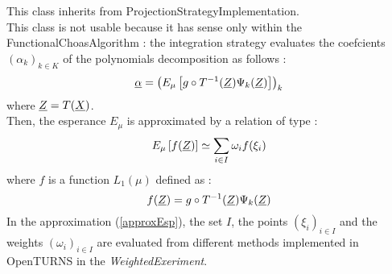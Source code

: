 This class inherits from ProjectionStrategyImplementation.\\

This class is not usable because it has sense only within the FunctionalChoasAlgorithm : the integration strategy evaluates the coefcients $(\alpha_k)_{k \in K}$ of the polynomials decomposition as follows : 
\begin{equation}\label{defEsp}
{\underline{\alpha}} = \left( E_{\mu} \left[ g \circ T^{-1}({\underline{Z}}) \Psi_k ({\underline{Z}}) \right]\right)_k
\end{equation}
where ${\underline{Z}} = T({\underline{X}})$.\\
Then, the esperance $ E_{\mu}$ is approximated by a relation of type : 
\begin{equation}\label{approxEsp}
E_{\mu} \left[ f({\underline{Z}}) \right] \simeq \sum_{i \in I} \omega_i f(\xi_i)
\end{equation}
where $f$ is a function $L_1(\mu)$ defined as : 
\begin{equation}\label{fEsp} 
f({\underline{Z}}) = g \circ T^{-1}({\underline{Z}}) \Psi_k ({\underline{Z}}) 
\end{equation}
In the approximation (\ref{approxEsp}), the set $I$, the points $(\xi_i)_{i \in I}$ and the weights $(\omega_i)_{i \in I}$ are evaluated from different methods implemented in OpenTURNS in the \emph{WeightedExeriment}.



